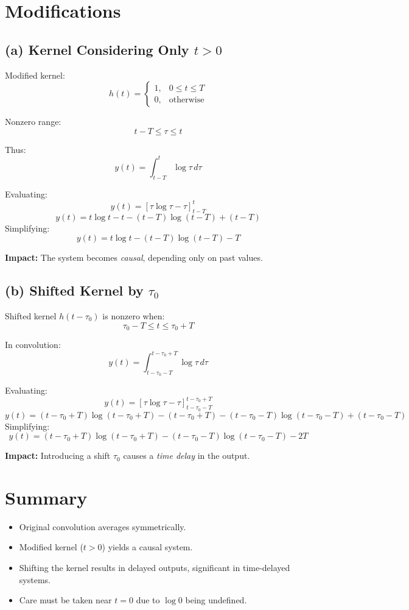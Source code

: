 \documentclass{article}
\begin{document}
\section*{Modifications}

\subsection*{(a) Kernel Considering Only \( t>0 \)}

Modified kernel:
\[
h(t) =
\begin{cases}
1, & 0 \leq t \leq T \\
0, & \text{otherwise}
\end{cases}
\]

Nonzero range:
\[
t-T \leq \tau \leq t
\]

Thus:
\[
y(t) = \int_{t-T}^{t} \log \tau \, d\tau
\]

Evaluating:
\[
y(t) = \left[ \tau \log \tau - \tau \right]_{t-T}^{t}
\]
\[
y(t) = t\log t - t - (t-T)\log(t-T) + (t-T)
\]
Simplifying:
\[
\boxed{y(t) = t\log t - (t-T)\log(t-T) - T}
\]

\textbf{Impact:} The system becomes \textit{causal}, depending only on past values.

\subsection*{(b) Shifted Kernel by \( \tau_0 \)}

Shifted kernel \( h(t-\tau_0) \) is nonzero when:
\[
\tau_0-T \leq t \leq \tau_0+T
\]

In convolution:
\[
y(t) = \int_{t-\tau_0-T}^{t-\tau_0+T} \log \tau \, d\tau
\]

Evaluating:
\[
y(t) = \left[ \tau \log \tau - \tau \right]_{t-\tau_0-T}^{t-\tau_0+T}
\]
\[
y(t) = (t-\tau_0+T)\log(t-\tau_0+T) - (t-\tau_0+T) - (t-\tau_0-T)\log(t-\tau_0-T) + (t-\tau_0-T)
\]
Simplifying:
\[
\boxed{y(t) = (t-\tau_0+T)\log(t-\tau_0+T) - (t-\tau_0-T)\log(t-\tau_0-T) - 2T}
\]

\textbf{Impact:} Introducing a shift \( \tau_0 \) causes a \textit{time delay} in the output.

\section*{Summary}

\begin{itemize}
    \item Original convolution averages symmetrically.
    \item Modified kernel (\( t>0 \)) yields a causal system.
    \item Shifting the kernel results in delayed outputs, significant in time-delayed systems.
    \item Care must be taken near \( t=0 \) due to \( \log 0 \) being undefined.
\end{itemize}
\end{document}
